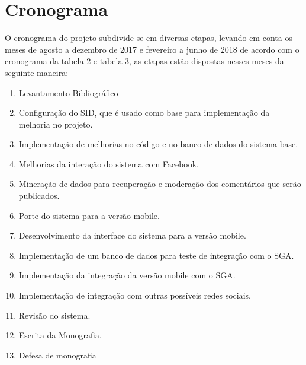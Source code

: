\chapter[Cronograma]{Cronograma}
	 O cronograma do projeto subdivide-se em diversas etapas, levando em conta os meses de agosto a dezembro de 2017 e fevereiro a junho de 2018 de acordo com o cronograma da tabela 2 e tabela 3, as etapas estão dispostas nesses meses da seguinte maneira:

\begin{enumerate}[label=\Roman*)]
	\item Levantamento Bibliográfico
	
	\item Configuração do SID, que é usado como base para implementação da melhoria no projeto.
	
	\item Implementação de melhorias no código e no banco de dados do sistema base.
	
	\item Melhorias da interação do sistema com Facebook.
	
	\item Mineração de dados para recuperação e moderação dos comentários que serão publicados.
	
	\item Porte do sistema para a versão mobile.
	
	\item Desenvolvimento da interface do sistema para a versão mobile.
	
	\item Implementação de um banco de dados para teste de integração com o SGA.
	
	\item Implementação da integração da versão mobile com o SGA.
	
	\item Implementação de integração com outras possíveis redes sociais.
	
	\item Revisão do sistema.
	
	\item Escrita da Monografia.
	
	\item Defesa de monografia
	
\end{enumerate}

